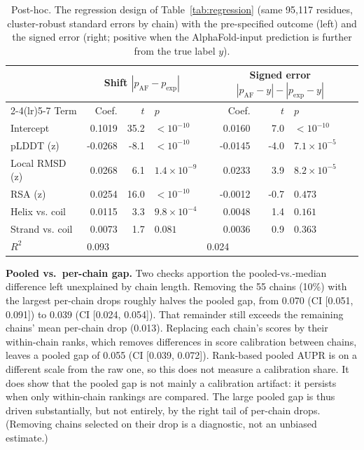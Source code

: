 \documentclass[10pt]{article}
\begin{document}
\begin{table}[t]
\centering
\small
\begin{tabular}{lrrlrrl}
\toprule
 & \multicolumn{3}{c}{Shift $|p_{\mathrm{AF}}-p_{\mathrm{exp}}|$} & \multicolumn{3}{c}{Signed error $|p_{\mathrm{AF}}-y|-|p_{\mathrm{exp}}-y|$} \\
\cmidrule(lr){2-4}\cmidrule(lr){5-7}
Term & Coef. & $t$ & $p$ & Coef. & $t$ & $p$ \\
\midrule
Intercept & 0.1019 & 35.2 & $< 10^{-10}$ & 0.0160 & 7.0 & $< 10^{-10}$ \\
pLDDT (z) & -0.0268 & -8.1 & $< 10^{-10}$ & -0.0145 & -4.0 & $7.1\times10^{-5}$ \\
Local RMSD (z) & 0.0268 & 6.1 & $1.4\times10^{-9}$ & 0.0233 & 3.9 & $8.2\times10^{-5}$ \\
RSA (z) & 0.0254 & 16.0 & $< 10^{-10}$ & -0.0012 & -0.7 & $0.473$ \\
Helix vs. coil & 0.0115 & 3.3 & $9.8\times10^{-4}$ & 0.0048 & 1.4 & $0.161$ \\
Strand vs. coil & 0.0073 & 1.7 & $0.081$ & 0.0036 & 0.9 & $0.363$ \\
\midrule
$R^2$ & \multicolumn{3}{l}{0.093} & \multicolumn{3}{l}{0.024} \\
\bottomrule
\end{tabular}
\caption{Post-hoc. The regression design of Table~\ref{tab:regression}
(same 95,117 residues, cluster-robust standard errors by chain) with the
pre-specified outcome (left) and the signed error (right; positive when the
AlphaFold-input prediction is further from the true label $y$).}
\label{tab:regcompare}
\end{table}

\textbf{Pooled vs.\ per-chain gap.} Two checks apportion the
pooled-vs.-median difference left unexplained by chain length. Removing the 55 chains
(10\%) with the largest per-chain drops roughly halves the pooled
gap, from 0.070 (CI [0.051, 0.091]) to 0.039 (CI
[0.024, 0.054]). That remainder still exceeds the remaining chains' mean
per-chain drop (0.013). Replacing each chain's scores by their
within-chain ranks, which removes differences in score calibration between
chains, leaves a pooled gap of 0.055 (CI [0.039, 0.072]). Rank-based
pooled AUPR is on a different scale from the raw one, so this does not
measure a calibration share. It does show that the pooled gap is not mainly
a calibration artifact: it persists when only within-chain rankings are
compared. The large pooled gap is thus driven substantially, but not
entirely, by the right tail of per-chain drops. (Removing chains selected
on their drop is a diagnostic, not an unbiased estimate.)
\end{document}

